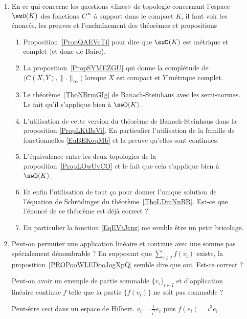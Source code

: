 \begin{enumerate}
        \item
            En ce qui concerne les questions «fines» de topologie concernant l'espace \( \swD(K)\) des fonctions \(  C^{\infty}\) à support dans le compact \( K\), il faut voir les énoncés, les preuves et l'enchaînement des théorèmes et propositions
            \begin{enumerate}
                \item Proposition~\ref{PropQAEVcTi} pour dire que \( \swD(K)\) est métrique et complet (et donc de Baire).
                \item La proposition~\ref{PropSYMEZGU} qui donne la complétude de \( \big( C(X,Y),\| . \|_{\infty} \big)\) lorsque \( X\) est compact et \( Y\) métrique complet.
                \item Le théorème~\ref{ThoNBrmGIg} de Banach-Steinhaus avec les semi-normes. Le fait qu'il s'applique bien à \( \swD(K)\).
                \item L'utilisation de cette version du théorème de Banach-Steinhaus dans la proposition \ref{PropLKtBsVi}. En particulier l'utilisation de la famille de fonctionnelles \eqref{EqBEKoqMb} et la preuve qu'elles sont continues.
                \item
                    L'équivalence entre les deux topologies de la proposition~\ref{PropLOwUvCO} et le fait que cela s'applique bien à \( \swD(K)\).
                \item
                    Et enfin l'utilisation de tout ça pour donner l'unique solution de l'équation de Schrödinger du théorème~\ref{ThoLDmNnBR}. Est-ce que l'énoncé de ce théorème est déjà correct ?
                \item
                    En particulier la fonction \eqref{EqEVtJcnz} me semble être un petit bricolage.
            \end{enumerate}
    \item
        Peut-on permuter une application linéaire et continue avec une somme pas spécialement dénombrable ? En supposant que \( \sum_{i\in I}f(v_i)\) existe, la proposition~\ref{PROPooWLEDooJogXpQ} semble dire que oui. Est-ce correct ?

        Peut-on avoir un exemple de partie sommable \( \{ v_i \}_{i\in I}\) et d'application linéaire continue \( f\) telle que la partie \( \{ f(v_i) \}\) ne soit pas sommable ?

        Peut-être ceci dans un espace de Hilbert.  \( v_i=\frac{1}{ i^2 }e_i\) puis \( f(e_i)=i^3e_i\).


\end{enumerate}
